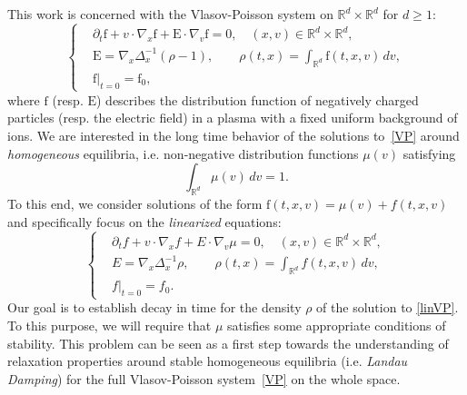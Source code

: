 \documentclass[11pt]{amsart}
\newcommand{\pa}{\partial}
\numberwithin{equation}{section}
\newcommand{\R}{\mathbb{R}}
\newcommand{\na}{\nabla}
\begin{document}
This work is concerned with the Vlasov-Poisson system on $\R^d \times \R^d$
 for $d \geq 1$:
\begin{equation}
\label{VP}
\left \{ 
\begin{aligned}
&\pa_t \mathrm{f} + v\cdot \na_x \mathrm{f} +  \mathrm{E} \cdot \na_v  \mathrm{f}  = 0, \quad (x,v) \in \R^d \times \R^d, \\
&\mathrm{E} = \nabla_x   \Delta_x^{-1}\left( \rho- 1 \right), \qquad \rho(t,x)= \int_{\R^d} \mathrm{f} (t,x,v)\, dv,\\
&\mathrm{f}|_{t=0} = \mathrm{f}_0, %
\end{aligned}
\right.
\end{equation}
where $\mathrm{f}$ (resp. $\mathrm{E}$) describes the distribution function of negatively charged particles (resp. the electric field) in a plasma with a fixed uniform background of ions.
We are interested in the long time behavior of the solutions to~\eqref{VP} around   \emph{homogeneous} equilibria, i.e. non-negative distribution functions $\mu(v)$ satisfying 
\begin{equation}
\label{eq:norma}
\int_{\R^d} \mu(v) \, dv = 1.
\end{equation}
To this end, we consider solutions of the form $\mathrm{f}(t,x,v) = \mu(v) + f(t,x,v)$ %
and specifically focus on the \emph{linearized} equations: %
\begin{equation}
\label{linVP}
\left \{ 
\begin{aligned}
&\pa_t f + v\cdot \na_x f +  E \cdot \na_v \mu = 0, \quad (x,v) \in \R^d \times \R^d, \\
&E = \nabla_x   \Delta_x^{-1} \rho, \qquad \rho(t,x)= \int_{\R^d} f (t,x,v)\, dv,\\
&f|_{t=0} = f_0.
\end{aligned}
\right.
\end{equation}
Our goal is to establish decay in time for the density $\rho$ of the solution to \eqref{linVP}. To this purpose, we will require that $\mu$ satisfies some appropriate  conditions of stability. This problem can be seen as a first step towards the understanding of relaxation properties around stable homogeneous equilibria  (i.e. \emph{Landau Damping})  for the full Vlasov-Poisson system~\eqref{VP} on the whole space.
\end{document}
